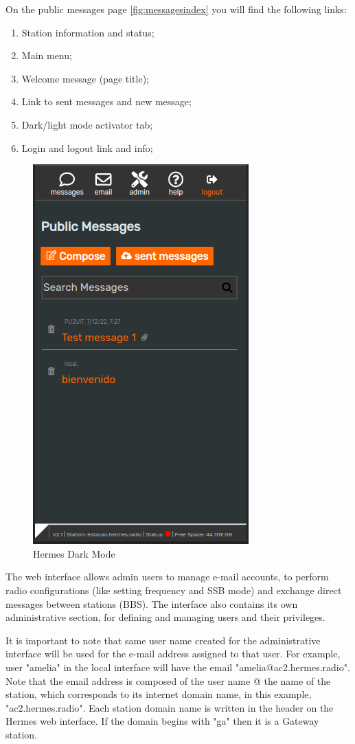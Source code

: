 \documentclass[11pt,a4paper]{article}
\begin{document}
On the public messages page \ref{fig:messagesindex} you will find the following links:

\begin{enumerate}
    \item Station information and status;
    \item Main menu;
    \item Welcome message (page title);
    \item Link to sent messages and new message;
    \item Dark/light mode activator tab;
    \item Login and logout link and info;
\end{enumerate}

\begin{figure}[H]
    \centering
    \includegraphics[width=0.5\columnwidth]{screenshots/frontend/en/darkmode.png}
    \caption{Hermes Dark Mode}
    \label{fig:darkmode}
\end{figure}
    
The web interface allows admin users to manage e-mail accounts, to perform radio configurations (like setting frequency and SSB mode) and exchange direct messages between stations (BBS). The interface also contains its own administrative section, for defining and managing users and their privileges. 

It is important to note that same user name created for the administrative interface will be used for the e-mail address assigned to that user.  For example, user "amelia" in the local interface will have the email "amelia@ac2.hermes.radio". Note that the email address is composed of the user name @ the name of the station, which corresponds to its internet domain name, in this example, "ac2.hermes.radio". Each station domain name is written in the header on the Hermes web interface. If the domain begins with "ga" then it is a Gateway station.
\end{document}
